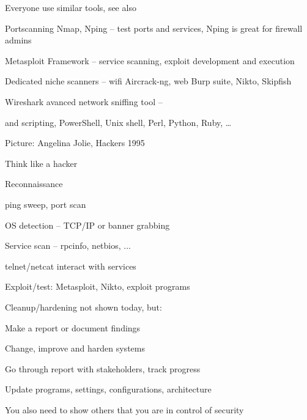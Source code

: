 \documentclass[Screen16to9,17pt]{foils}
\begin{document}





\begin{list2}
\item Everyone use similar tools, see also 
\item Portscanning Nmap, Nping -- test ports and services, Nping is great for firewall admins 
\item Metasploit Framework -- service scanning, exploit development and execution 
\item Dedicated niche scanners -- wifi Aircrack-ng, web Burp suite, Nikto, Skipfish 
\item Wireshark avanced network sniffing tool -- 
\item and scripting, PowerShell, Unix shell, Perl, Python, Ruby, \ldots
\end{list2}

Picture: Angelina Jolie, Hackers 1995





\begin{list1}
\item Think like a hacker
\item Reconnaissance
\begin{list2}
\item ping sweep, port scan
\item OS detection -- TCP/IP or banner grabbing
\item Service scan -- rpcinfo, netbios, ...
\item telnet/netcat interact with services
\end{list2}
\item Exploit/test: Metasploit, Nikto, exploit programs
\item Cleanup/hardening not shown today, but:
\begin{list2}
\item Make a report or document findings
\item Change, improve and harden systems
\item Go through report with stakeholders, track progress
\item Update programs, settings, configurations, architecture
\end{list2}
\item You also need to show others that you are in control of security
\end{list1}
\end{document}
